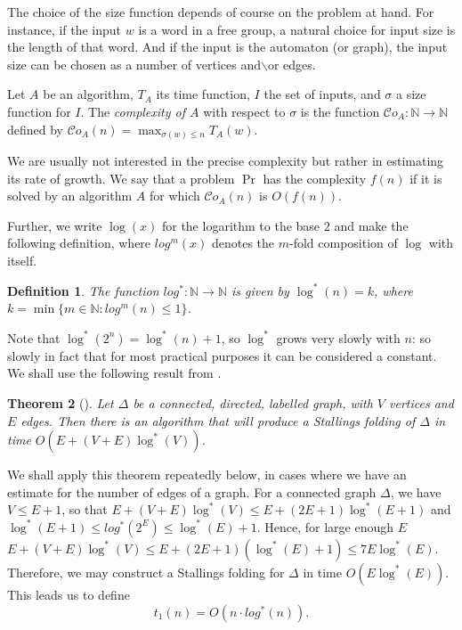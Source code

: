 \documentclass[a4paper,12pt]{article}
\newcommand{\D}{\Delta }
\newtheorem{theorem}{Theorem}[section]
\newtheorem{definition}[theorem]{Definition}
\numberwithin{equation}{section}
\numberwithin{figure}{section}
\newcommand{\NN}{\ensuremath{\mathbb{N}}}
\newcommand{\cC}{\mathcal{C}}
\newcommand{\maps}{\rightarrow}
\begin{document}
The choice of the size function depends of course on the problem at hand.
For instance, if the input $w$ is a word in a free group, a natural choice for input size is the length of that word. And if the input is the automaton (or graph), the input size can be chosen as a number of vertices and{$\backslash$}or edges.

Let $A$ be an algorithm, $T_{A}$ its time function, $I$ the set of
inputs, and $\sigma$ a size function for $I$. The \emph{ complexity of $A$} with respect to $\sigma$ is the function
$\cC o_{A}:\NN \to \NN$ defined by $\cC o_{A}(n)=\max_{\sigma(w)\le n}
T_{A}(w)$. 

We are usually not interested in the precise complexity
but rather in estimating its rate of growth. We say that a problem
$\Pr$ has the complexity $f(n)$ if it is solved by an
algorithm $A$ for which $\cC o_{A}(n)$ is $O(f(n))$. 

Further, we write $\log(x)$ for the logarithm to the base $2$ and make the
following definition, where $log^m(x)$ denotes the $m$-fold composition
of $\log$ with itself.
\begin{definition}\label{def:log}
The function $log^*:\NN\maps \NN$ is given by $\log^*(n)=k$, where
$k=\min\{m\in \NN: log^m(n)\le 1\}$.
\end{definition}
Note that $\log^*(2^n)=\log^*(n)+1$, so $\log^*$ grows very slowly with $n$:
so slowly in fact that for most practical purposes it can be
considered a constant.
We shall use the following result from \cite{touikan06}.
\begin{theorem}[{\cite[Theorem 1.6]{touikan06}}]%
Let $\D$ be a connected, directed, labelled graph, with $V$ vertices and
$E$ edges. Then there is an algorithm that will produce a Stallings folding of
$\D$ in time $O(E+(V+E)\log^*(V))$.
\end{theorem}

We shall apply this theorem repeatedly below, in cases where we
have an estimate for the number of edges of a graph. For a
connected graph $\D$, we have $V\le E+1$, so that
$E+(V+E)\log^*(V)\le E+(2E+1)\log^*(E+1)$ and $\log^*(E+1)\le
log^*(2^E)\le \log^*(E)+1$. Hence, for large enough $E$
$E+(V+E)\log^*(V)\le E+(2E+1)(\log^*(E)+1)\le 7E\log^*(E)$.
Therefore, we may construct a Stallings folding for $\D$ in time
$O(E\log^*(E))$. This leads us to define
\begin{equation}\label{t1} t_1(n) = O (n \cdot log^{\ast}(n)).
\end{equation}
\end{document}
